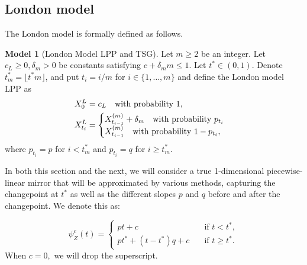 \documentclass[12pt]{article}
\theoremstyle{definition}
\newtheorem{model}{Model} %
\begin{document}
\subsection{London model}\label{sec:London}
The London model is formally defined as follows.
\begin{model}[London Model LPP and TSG]\label{model:London} Let $m\geq 2$ be an integer. Let $c_L\geq0, \delta_m>0$ be constants satisfying $c+\delta_m m\leq 1$. Let $t^*\in(0,1)$. Denote $t^*_m = \lfloor t^*m\rfloor $, and put $t_i = i/m$ for $i\in\{1,\ldots,m\}$ and define the London model LPP as
\begin{align*}
X^{L}_0 & = c_L \quad \text{with probability 1}, \notag \\
X^{L}_{t_i}&=\begin{cases}
X^{(m)}_{t_{i-1}}+ \delta_m \quad \text{with probability $p_{t_i}$} \\
X^{(m)}_{t_{i-1}} \quad \text{with probability $1-p_{t_i}$},
\end{cases}
\end{align*}
where $p_{t_i} = p$ for $i < t_m^*$ and $p_{t_i} = q$ for $i \geq t_m^*$.

\end{model}

In both this section and the next, we will consider a true 1-dimensional piecewise-linear mirror that will be approximated by various methods, capturing the changepoint at $t^*$ as well as the different slopes $p$ and $q$ before and after the changepoint. We denote this as:

$$
\psi_Z^c (t) = \begin{cases}
     pt +c &\quad \text{if } t < t^*, \\
     pt^*+(t-t^*)q +c &\quad \text{if } t \geq t^*. 
 \end{cases} 
$$ 
When $c=0,$ we will drop the superscript.
\end{document}
